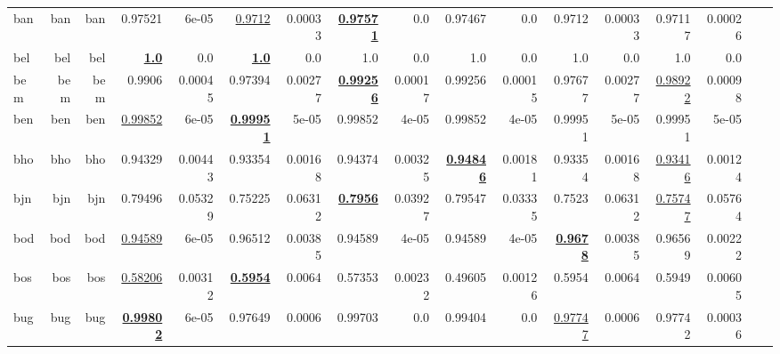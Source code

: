 \documentclass[11pt]{article}
\begin{document}
\begin{table*}[h]
{\begin{tabular}{lrrrrrrrrrrrrrrrr}
ban         & ban         & ban         & 0.97521         & 6e-05         & \underline{0.9712}         & 0.00033         & \textbf{\underline{0.97571}}         & 0.0         & 0.97467         & 0.0         & 0.9712         & 0.00033         & 0.97117         & 0.00026         \\
bel         & bel         & bel         & \textbf{\underline{1.0}}         & 0.0         & \textbf{\underline{1.0}}         & 0.0         & 1.0         & 0.0         & 1.0         & 0.0         & 1.0         & 0.0         & 1.0         & 0.0         \\
bem         & bem         & bem         & 0.9906         & 0.00045         & 0.97394         & 0.00277         & \textbf{\underline{0.99256}}         & 0.00017         & 0.99256         & 0.00015         & 0.97677         & 0.00277         & \underline{0.98922}         & 0.00098         \\
ben         & ben         & ben         & \underline{0.99852}         & 6e-05         & \textbf{\underline{0.99951}}         & 5e-05         & 0.99852         & 4e-05         & 0.99852         & 4e-05         & 0.99951         & 5e-05         & 0.99951         & 5e-05         \\
bho         & bho         & bho         & 0.94329         & 0.00443         & 0.93354         & 0.00168         & 0.94374         & 0.00325         & \textbf{\underline{0.94846}}         & 0.00181         & 0.93354         & 0.00168         & \underline{0.93416}         & 0.00124         \\
bjn         & bjn         & bjn         & 0.79496         & 0.05329         & 0.75225         & 0.06312         & \textbf{\underline{0.7956}}         & 0.03927         & 0.79547         & 0.03335         & 0.7523         & 0.06312         & \underline{0.75747}         & 0.05764         \\
bod         & bod         & bod         & \underline{0.94589}         & 6e-05         & 0.96512         & 0.00385         & 0.94589         & 4e-05         & 0.94589         & 4e-05         & \textbf{\underline{0.9678}}         & 0.00385         & 0.96569         & 0.00222         \\
bos         & bos         & bos         & \underline{0.58206}         & 0.00312         & \textbf{\underline{0.5954}}         & 0.0064         & 0.57353         & 0.00232         & 0.49605         & 0.00126         & 0.5954         & 0.0064         & 0.5949         & 0.00605         \\
bug         & bug         & bug         & \textbf{\underline{0.99802}}         & 6e-05         & 0.97649         & 0.0006         & 0.99703         & 0.0         & 0.99404         & 0.0         & \underline{0.97747}         & 0.0006         & 0.97742         & 0.00036         \\

\end{tabular}}
\end{table*}
\end{document}
